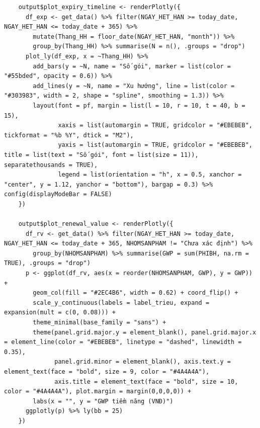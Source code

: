 \documentclass[12pt, a4paper]{article}
\begin{document}
\begin{lstlisting}
    output$plot_expiry_timeline <- renderPlotly({
      df_exp <- get_data() %>% filter(NGAY_HET_HAN >= today_date, NGAY_HET_HAN <= today_date + 365) %>%
        mutate(Thang_HH = floor_date(NGAY_HET_HAN, "month")) %>%
        group_by(Thang_HH) %>% summarise(N = n(), .groups = "drop")
      plot_ly(df_exp, x = ~Thang_HH) %>%
        add_bars(y = ~N, name = "Số gói", marker = list(color = "#55bded", opacity = 0.6)) %>%
        add_lines(y = ~N, name = "Xu hướng", line = list(color = "#303983", width = 2, shape = "spline", smoothing = 1.3)) %>%
        layout(font = pf, margin = list(l = 10, r = 10, t = 40, b = 15),
               xaxis = list(automargin = TRUE, gridcolor = "#EBEBEB", tickformat = "%b %Y", dtick = "M2"),
               yaxis = list(automargin = TRUE, gridcolor = "#EBEBEB", title = list(text = "Số gói", font = list(size = 11)), separatethousands = TRUE),
               legend = list(orientation = "h", x = 0.5, xanchor = "center", y = 1.12, yanchor = "bottom"), bargap = 0.3) %>% config(displayModeBar = FALSE)
    })

    output$plot_renewal_value <- renderPlotly({
      df_rv <- get_data() %>% filter(NGAY_HET_HAN >= today_date, NGAY_HET_HAN <= today_date + 365, NHOMSANPHAM != "Chưa xác định") %>%
        group_by(NHOMSANPHAM) %>% summarise(GWP = sum(PHIBH, na.rm = TRUE), .groups = "drop")
      p <- ggplot(df_rv, aes(x = reorder(NHOMSANPHAM, GWP), y = GWP)) +
        geom_col(fill = "#2EC4B6", width = 0.62) + coord_flip() +
        scale_y_continuous(labels = label_trieu, expand = expansion(mult = c(0, 0.08))) +
        theme_minimal(base_family = "sans") +
        theme(panel.grid.major.y = element_blank(), panel.grid.major.x = element_line(color = "#EBEBEB", linetype = "dashed", linewidth = 0.35),
              panel.grid.minor = element_blank(), axis.text.y = element_text(face = "bold", size = 9, color = "#4A4A4A"),
              axis.title = element_text(face = "bold", size = 10, color = "#4A4A4A"), plot.margin = margin(0,0,0,0)) +
        labs(x = "", y = "GWP tiềm năng (VNĐ)")
      ggplotly(p) %>% ly(bb = 25)
    })


\end{lstlisting}
\end{document}
